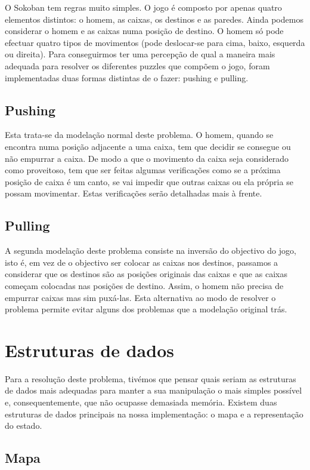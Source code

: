 \documentclass[twocolumn]{article}
\begin{document}
O Sokoban tem regras muito simples. O jogo é composto por apenas quatro elementos distintos: o homem, as caixas, os destinos e as paredes. Ainda podemos considerar o homem e as caixas numa posição de destino. O homem só pode efectuar quatro tipos de movimentos (pode deslocar-se para cima, baixo, esquerda ou direita). Para conseguirmos ter uma percepção de qual a maneira mais adequada para resolver os diferentes puzzles que compõem o jogo, foram implementadas duas formas distintas de o fazer: pushing e pulling.

\subsection{Pushing}

Esta trata-se da modelação normal deste problema. O homem, quando se encontra numa posição adjacente a uma caixa, tem que decidir se consegue ou não empurrar a caixa. De modo a que o movimento da caixa seja considerado como proveitoso, tem que ser feitas algumas verificações como se a próxima posição de caixa é um canto, se vai impedir que outras caixas ou ela própria se possam movimentar. Estas verificações serão detalhadas mais à frente.

\subsection{Pulling}

A segunda modelação deste problema consiste na inversão do objectivo do jogo, isto é, em vez de o objectivo ser colocar as caixas nos destinos, passamos a considerar que os destinos são as posições originais das caixas e que as caixas começam colocadas nas posições de destino. Assim, o homem não precisa de empurrar caixas mas sim puxá-las. Esta alternativa ao modo de resolver o problema permite evitar alguns dos problemas que a modelação original trás.

\section{Estruturas de dados}

Para a resolução deste problema, tivémos que pensar quais seriam as estruturas de dados mais adequadas para manter a sua manipulação o mais simples possível e, consequentemente, que não ocupasse demasiada memória. Existem duas estruturas de dados principais na nossa implementação: o mapa e a representação do estado.

\subsection{Mapa}
\end{document}
